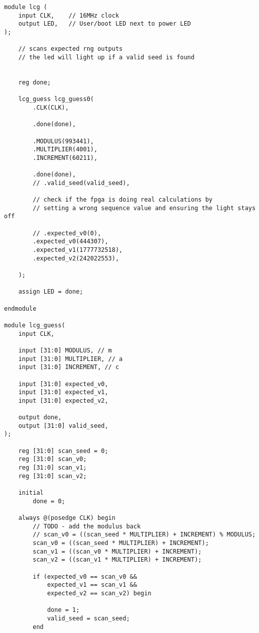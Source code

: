 \documentclass{article}
\begin{document}
    \begin{lstlisting}
module lcg (
    input CLK,    // 16MHz clock
    output LED,   // User/boot LED next to power LED
);

    // scans expected rng outputs
    // the led will light up if a valid seed is found
    
    
    reg done;

    lcg_guess lcg_guess0(
        .CLK(CLK),
        
        .done(done),
                
        .MODULUS(993441),
        .MULTIPLIER(4001),
        .INCREMENT(60211),
        
        .done(done),
        // .valid_seed(valid_seed),
        
        // check if the fpga is doing real calculations by 
        // setting a wrong sequence value and ensuring the light stays off
        
        // .expected_v0(0),
        .expected_v0(444307),
        .expected_v1(1777732518),
        .expected_v2(242022553),
        
    );
    
    assign LED = done;

endmodule

module lcg_guess(
    input CLK,
    
    input [31:0] MODULUS, // m
    input [31:0] MULTIPLIER, // a
    input [31:0] INCREMENT, // c
    
    input [31:0] expected_v0,
    input [31:0] expected_v1,
    input [31:0] expected_v2,
    
    output done,
    output [31:0] valid_seed,
);

    reg [31:0] scan_seed = 0;
    reg [31:0] scan_v0;
    reg [31:0] scan_v1;
    reg [31:0] scan_v2;
    
    initial 
        done = 0;
    
    always @(posedge CLK) begin
        // TODO - add the modulus back
        // scan_v0 = ((scan_seed * MULTIPLIER) + INCREMENT) % MODULUS;
        scan_v0 = ((scan_seed * MULTIPLIER) + INCREMENT);
        scan_v1 = ((scan_v0 * MULTIPLIER) + INCREMENT);
        scan_v2 = ((scan_v1 * MULTIPLIER) + INCREMENT);
        
        if (expected_v0 == scan_v0 &&
            expected_v1 == scan_v1 &&
            expected_v2 == scan_v2) begin
            
            done = 1;
            valid_seed = scan_seed;
        end
        

\end{lstlisting}
\end{document}
